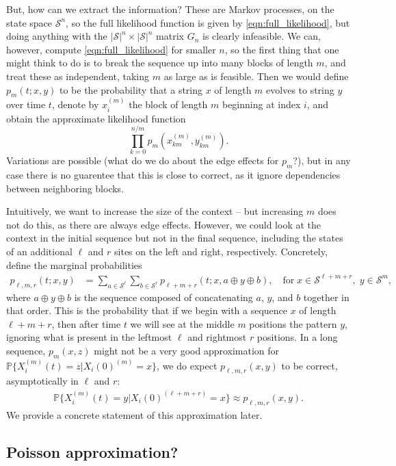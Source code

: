 \documentclass{article}
\renewcommand{\P}{\mathbb{P}}
\newcommand{\calS}{\mathcal{S}}  %
\newcommand{\join}{\oplus}  %
\theoremstyle{plain}
\theoremstyle{definition}
\begin{document}
But, how can we extract the information?
These are Markov processes, on the state space $\calS^n$, 
so the full likelihood function is given by \eqref{eqn:full_likelihood},
but doing anything with the $|\calS|^n \times |\calS|^n$ matrix $G_n$ is clearly infeasible.
We can, however, compute \eqref{eqn:full_likelihood} for smaller $n$,
so the first thing that one might think to do is to break the sequence up into many blocks of length $m$,
and treat these as independent, taking $m$ as large as is feasible.
Then we would define $p_m(t;x,y)$ to be the probability that a string $x$ of length $m$ evolves to string $y$ over time $t$,
denote by $x_i^{(m)}$ the block of length $m$ beginning at index $i$,
and obtain the approximate likelihood function
\[
  \prod_{k=0}^{n/m} p_m(x_{km}^{(m)},y_{km}^{(m)}) .
\]
Variations are possible (what do we do about the edge effects for $p_m$?),
but in any case there is no guarentee that this is close to correct,
as it ignore dependencies between neighboring blocks.

Intuitively, we want to increase the size of the context 
-- but increasing $m$ does not do this, as there are always edge effects.
However, we could look at the context in the initial sequence but not in the final sequence,
including the states of an additional $\ell$ and $r$ sites on the left and right, respectively.
Concretely, define the marginal probabilities
\begin{align}
  p_{\ell,m,r}(t;x,y) &= \sum_{a \in \calS^\ell} \sum_{b \in \calS^r} p_{\ell+m+r}(t;x,a \join y \join b) , \quad \text{for}\; x \in \calS^{\ell+m+r}, \; y \in \calS^m ,
\end{align}
where $a \join y \join b$ is the sequence composed of concatenating $a$, $y$, and $b$ together in that order.
This is the probability that if we begin with a sequence $x$ of length $\ell+m+r$, 
then after time $t$ we will see at the middle $m$ positions the pattern $y$,
ignoring what is present in the leftmost $\ell$ and rightmost $r$ positions.
In a long sequence, $p_m(x,z)$ might not be a very good approximation for $\P\{ X_i^{(m)}(t) = z | X_i(0)^{(m)} = x \}$,
we do expect $p_{\ell,m,r}(x,y)$ to be correct, asymptotically in $\ell$ and $r$:
\begin{align} \label{eqn:window_approx}
  \P\{ X_i^{(m)}(t) = y | X_i(0)^{(\ell+m+r)} = x \} \approx p_{\ell,m,r}(x,y) .
\end{align}
We provide a concrete statement of this approximation later.

\subsection{Poisson approximation?}
\end{document}
